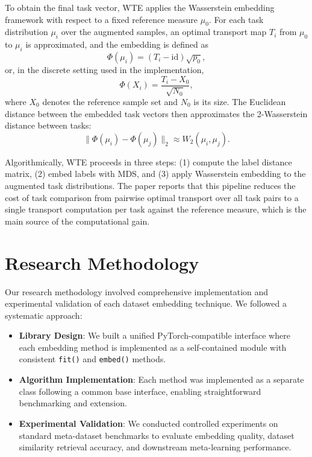 \documentclass[peerreview]{IEEEtran}
\begin{document}
To obtain the final task vector, WTE applies the Wasserstein
embedding framework with respect to a fixed reference measure
$\mu_0$. For each task distribution $\mu_i$ over the augmented
samples, an optimal transport map $T_i$ from $\mu_0$ to $\mu_i$ is
approximated, and the embedding is defined as
\begin{equation}
\Phi(\mu_i) = (T_i - \mathrm{id})\sqrt{p_0},
\end{equation}
or, in the discrete setting used in the implementation,
\begin{equation}
\Phi(X_i) = \frac{T_i - X_0}{\sqrt{N_0}},
\end{equation}
where $X_0$ denotes the reference sample set and $N_0$ is its size.
The Euclidean distance between the embedded task vectors then
approximates the 2-Wasserstein distance between tasks:
\begin{equation}
\|\Phi(\mu_i) - \Phi(\mu_j)\|_2 \approx W_2(\mu_i, \mu_j).
\end{equation}

Algorithmically, WTE proceeds in three steps: (1) compute the label
distance matrix, (2) embed labels with MDS, and (3) apply
Wasserstein embedding to the augmented task distributions. The paper
reports that this pipeline reduces the cost of task comparison from
pairwise optimal transport over all task pairs to a single transport
computation per task against the reference measure, which is the main
source of the computational gain.


\section{Research Methodology}
Our research methodology involved comprehensive implementation and
experimental validation of each dataset embedding technique. We
followed a systematic approach:

\begin{itemize}
    \item \textbf{Library Design}: We built a unified PyTorch-compatible
    interface where each embedding method is implemented as a
    self-contained module with consistent \texttt{fit()} and
    \texttt{embed()} methods.
    \item \textbf{Algorithm Implementation}: Each method was implemented
    as a separate class following a common base interface, enabling
    straightforward benchmarking and extension.
    \item \textbf{Experimental Validation}: We conducted controlled
    experiments on standard meta-dataset benchmarks to evaluate
    embedding quality, dataset similarity retrieval accuracy, and
    downstream meta-learning performance.
\end{itemize}
\end{document}
